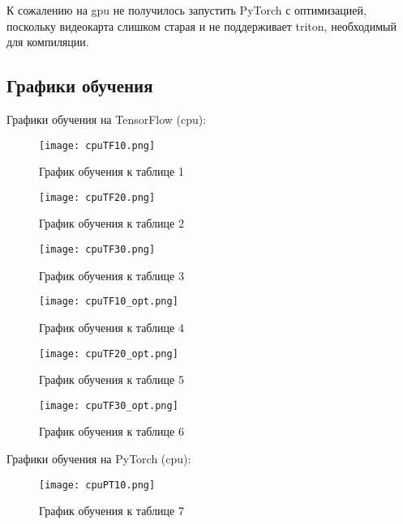 \documentclass[a4paper,12pt,titlepage,final]{article}
\begin{document}
К сожалению на gpu не получилось запустить PyTorch с оптимизацией, поскольку видеокарта слишком старая и не поддерживает triton, необходимый для компиляции.






\begin{center}
    \item \subsection{Графики обучения}
\end{center}

Графики обучения на TensorFlow (cpu):

\begin{figure}[H]
\centering
\texttt{[image: cpuTF10.png]}
\caption{График обучения к таблице 1}
\label{cputf10}
\end{figure}

\begin{figure}[H]
\centering
\texttt{[image: cpuTF20.png]}
\caption{График обучения к таблице 2}
\label{cputf20}
\end{figure}

\begin{figure}[H]
\centering
\texttt{[image: cpuTF30.png]}
\caption{График обучения к таблице 3}
\label{cputf30}
\end{figure}

\begin{figure}[H]
\centering
\texttt{[image: cpuTF10\_opt.png]}
\caption{График обучения к таблице 4}
\label{cputf10_opt}
\end{figure}

\begin{figure}[H]
\centering
\texttt{[image: cpuTF20\_opt.png]}
\caption{График обучения к таблице 5}
\label{cputf20_opt}
\end{figure}

\begin{figure}[H]
\centering
\texttt{[image: cpuTF30\_opt.png]}
\caption{График обучения к таблице 6}
\label{cputf30_opt}
\end{figure}

\newpage
Графики обучения на PyTorch (cpu):

\begin{figure}[H]
\centering
\texttt{[image: cpuPT10.png]}
\caption{График обучения к таблице 7}
\label{cpupt10}
\end{figure}
\end{document}
